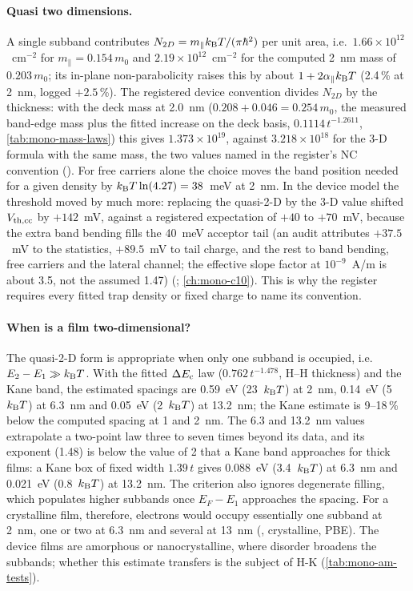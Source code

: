 \paragraph{Quasi two dimensions.} A single subband contributes $N_{2D} = m_\parallel k_{\mathrm{B}}T/(\pi\hbar^2)$ per unit area,
i.e.\ $1.66\times10^{12}$~cm$^{-2}$ for $m_\parallel = 0.154\,m_0$ and $2.19\times10^{12}$~cm$^{-2}$ for the computed
2~nm mass of $0.203\,m_0$; its in-plane non-parabolicity raises this by about $1+2\alpha_\parallel k_{\mathrm{B}}T$ (2.4\,\% at 2~nm,
logged $+2.5$\,\%). The registered device convention divides $N_{2D}$ by the thickness: with the deck mass at 2.0~nm
($0.208 + 0.046 = 0.254\,m_0$, the measured band-edge mass plus the fitted increase on the deck basis,
$0.1114\,t^{-1.2611}$, \cref{tab:mono-mass-laws}) this gives $1.373\times10^{19}$\cmcu{}, against $3.218\times10^{18}$\cmcu{} for the 3-D
formula with the same mass, the two values named in the register's NC convention (). For free carriers alone the
choice moves the band position needed for a given density by $k_{\mathrm{B}}T\ln(4.27) = 38$~meV at 2~nm. In the device model the
threshold moved by much more: replacing the quasi-2-D by the 3-D value shifted $V_{\mathrm{th,cc}}$ by $+142$~mV, against a
registered expectation of $+40$ to $+70$~mV, because the extra band bending fills the 40~meV acceptor tail (an audit
attributes $+37.5$~mV to the statistics, $+89.5$~mV to tail charge, and the rest to band bending, free carriers and the
lateral channel; the effective slope factor at $10^{-9}$~A/\textmu m is about 3.5, not the assumed 1.47) (;
\cref{ch:mono-c10}). This is why the register requires every fitted trap density or fixed charge to name its convention.

\paragraph{When is a film two-dimensional?} The quasi-2-D form is appropriate when only one subband is occupied, i.e.\
$E_2-E_1 \gg k_{\mathrm{B}}T$. With the fitted $\Delta E_{\mathrm{c}}$ law ($0.762\,t^{-1.478}$, H--H thickness) and the Kane band, the estimated
spacings are 0.59~eV (23~$k_{\mathrm{B}}T$) at 2~nm, 0.14~eV (5~$k_{\mathrm{B}}T$) at 6.3~nm and 0.05~eV (2~$k_{\mathrm{B}}T$) at 13.2~nm; the Kane estimate
is 9--18\,\% below the computed spacing at 1 and 2~nm. The 6.3 and 13.2~nm values extrapolate a two-point law three to
seven times beyond its data, and its exponent (1.48) is below the value of 2 that a Kane band approaches for thick
films: a Kane box of fixed width $1.39\,t$ gives 0.088~eV (3.4~$k_{\mathrm{B}}T$) at 6.3~nm and 0.021~eV (0.8~$k_{\mathrm{B}}T$) at 13.2~nm. The
criterion also ignores degenerate filling, which populates higher subbands once $E_F - E_1$ approaches the spacing. For
a crystalline film, therefore, electrons would occupy essentially one subband at 2~nm, one or two at 6.3~nm and several
at 13~nm (\prov{derived}, crystalline, PBE). The device films are
amorphous or nanocrystalline, where disorder broadens the subbands; whether this estimate transfers is the subject of
H-K (\cref{tab:mono-am-tests}).

